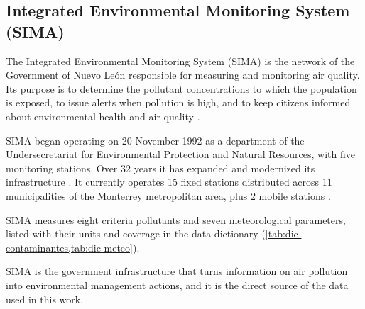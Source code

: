 \subsection{Integrated Environmental Monitoring System (SIMA)}
\label{sec:sima}

The Integrated Environmental Monitoring System (SIMA) is the network of the
Government of Nuevo León responsible for measuring and monitoring air
quality. Its purpose is to determine the pollutant concentrations to which
the population is exposed, to issue alerts when pollution is high, and to
keep citizens informed about environmental health and air quality
\parencite{gobiernoNL2026PIGECA}.

SIMA began operating on 20 November 1992 as a department of the
Undersecretariat for Environmental Protection and Natural Resources, with
five monitoring stations. Over 32 years it has expanded and modernized its
infrastructure \parencite{villasaez2024}. It currently operates 15 fixed
stations distributed across 11 municipalities of the Monterrey metropolitan
area, plus 2 mobile stations \parencite{gobiernoNL2026ModernizacionSIMA}.

SIMA measures eight criteria pollutants and seven meteorological parameters,
listed with their units and coverage in the data dictionary
(\cref{tab:dic-contaminantes,tab:dic-meteo}).

SIMA is the government infrastructure that turns information on air
pollution into environmental management actions, and it is the direct
source of the data used in this work.
